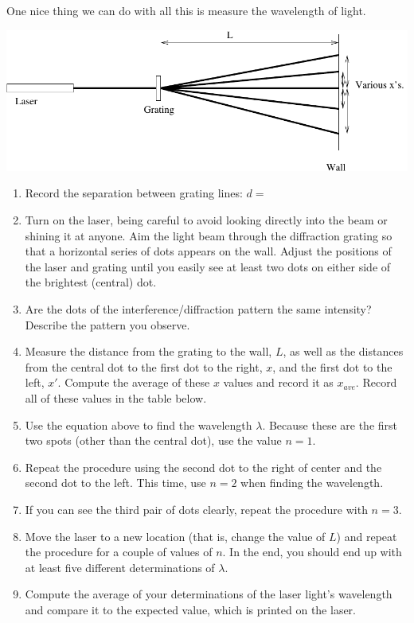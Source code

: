 One nice thing we can do with all this is measure the wavelength of light.

\bigskip
\pagebreak[2]
\centerline{\includegraphics[width=\textwidth]{diffraction/difffig.pdf}}
\bigskip

\begin{enumerate}
\item Record the separation between grating lines: \( d= \)
\item Turn on the laser, being careful to avoid looking directly into the
beam or shining it at anyone. Aim the light beam through the diffraction
grating so that a horizontal series of dots appears on the wall. Adjust
the positions of the laser and grating until you easily see at least
two dots on either side of the brightest (central) dot.
\item Are the dots of the interference/diffraction pattern the same intensity?
Describe the pattern you observe.\answerspace{15mm}

\item Measure the distance from the grating to the wall, $L$,
as well as the distances from the central dot to the first dot to
the right, $x$, and the first dot to the left, $x'$. Compute the average
of these $x$ values and record it as $x_{ave}$. Record all of these
values in the table below.
\item Use the equation above to find the wavelength $\lambda$.
Because these are the first two spots (other than the central dot),
use the value $n=1$.
\item Repeat the procedure using the second dot to the right
of center and the second dot to the left.  This time, use $n=2$ 
when finding the wavelength.
\item If you can see the third pair of dots clearly, repeat the
procedure with $n=3$.
\item Move the laser to a new location (that is, change the
value of $L$) and repeat the procedure for a couple of values
of $n$.  In the end, you should end up with at least
five different determinations of $\lambda$.
\item Compute the average of your determinations of the laser light's
  wavelength and compare it to the expected value, which is printed on the
  laser.
\answerspace{15mm}

\end{enumerate}
